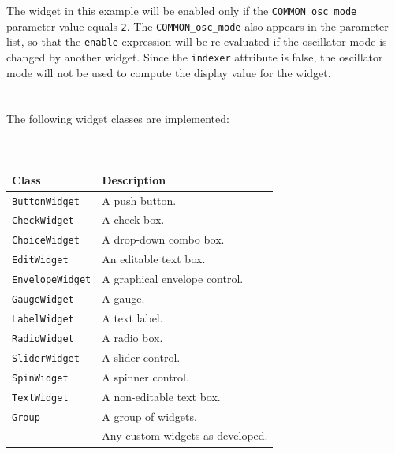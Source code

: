 \documentclass[a4paper,twoside,12pt]{article}
\newcommand{\code}[1]{\color{red}\texttt{#1}\color{black}}
\begin{document}
The widget in this example will be enabled only if the
\code{COMMON\_osc\_mode}{} parameter value equals \code{2}. The
\code{COMMON\_osc\_mode}{} also appears in the parameter list, so
that the \code{enable}{} expression will be re-evaluated if the
oscillator mode is changed by another widget. Since the
\code{indexer}{} attribute is false, the oscillator mode will not
be used to compute the display value for the widget.
\\
\\
\\
The following widget classes are implemented:
\\
\\
\\
\begin{tabular}{|l|p{9cm}|}
\hline
Class & Description \\
\hline
\code{ButtonWidget} & A push button. \\
\code{CheckWidget} & A check box. \\
\code{ChoiceWidget} & A drop-down combo box. \\
\code{EditWidget} & An editable text box. \\
\code{EnvelopeWidget} & A graphical envelope control. \\
\code{GaugeWidget} & A gauge. \\
\code{LabelWidget} & A text label. \\
\code{RadioWidget} & A radio box. \\
\code{SliderWidget} & A slider control. \\
\code{SpinWidget} & A spinner control. \\
\code{TextWidget} & A non-editable text box. \\
\code{Group} & A group of widgets. \\
\code{-} & Any custom widgets as developed. \\
\hline
\end{tabular}
\end{document}
